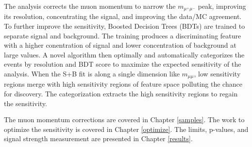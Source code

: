 The analysis corrects the muon momentum to narrow the $m_{\mu^+\mu^-}$ peak, improving its resolution, concentrating the signal, and improving the data/MC agreement. To further improve the sensitivity, Boosted Decision Trees (BDTs) \cite{bdt} are trained to separate signal and background. The training produces a discriminating feature with a higher conentration of signal and lower concentration of background at large values. A novel algorithm then optimally and automatically categorizes the events by resolution and BDT score to maximize the expected sensitivity of the analysis. When the S+B fit is along a single dimension like $m_{\mu\mu}$, low sensitivity regions merge with high sensitivity regions of feature space polluting the chance for discovery. The categorization extracts the high sensitivity regions to regain the sensitivity. 

The muon momentum corrections are covered in Chapter \ref{samples}. The work to optimize the sensitivity is covered in Chapter \ref{optimize}. The limits, p-values, and signal strength measurement are presented in Chapter \ref{results}.

